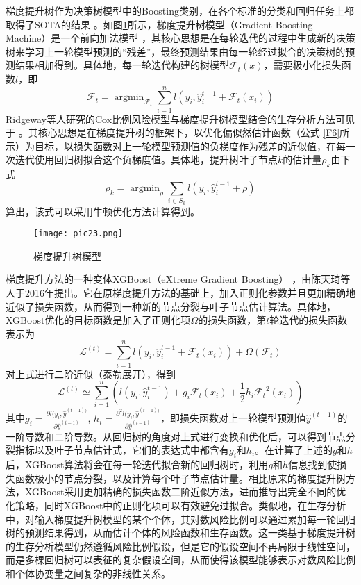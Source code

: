梯度提升树作为决策树模型中的Boosting类别，在各个标准的分类和回归任务上都取得了SOTA的结果 。如图\ref{pic23}所示，梯度提升树模型（Gradient Boosting Machine）是一个前向加法模型 ，其核心思想是在每轮迭代的过程中生成新的决策树来学习上一轮模型预测的“残差”，最终预测结果由每一轮经过拟合的决策树的预测结果相加得到。具体地，每一轮迭代构建的树模型$\mathcal{F}_t (x)$，需要极小化损失函数$l$，即
\begin{equation}
\mathcal{F}_t = \mathop{\arg\min}_{\mathcal{F}_t} \sum_{i=1}^n l(y_i, \hat{y}_i^{t-1} + \mathcal{F}_t(x_i)) \label{F9}
\end{equation}
Ridgeway等人研究的Cox比例风险模型与梯度提升树模型结合的生存分析方法可见于 。其核心思想是在梯度提升树的框架下，以优化偏似然估计函数（公式 \eqref{F6}所示）为目标，以损失函数对上一轮模型预测值的负梯度作为残差的近似值，在每一次迭代使用回归树拟合这个负梯度值。具体地，提升树叶子节点$k$的估计量$\rho_k$由下式
\begin{equation}
\rho_k = \mathop{\arg\min}_{\rho} \sum_{i\in S_k} l(y_i, \hat{y}_i^{t-1} + \rho) \label{F10}
\end{equation}算出，该式可以采用牛顿优化方法计算得到。

\begin{figure}[H]
\texttt{[image: pic23.png]}
\caption{梯度提升树模型}
\label{pic23}
\end{figure}

梯度提升方法的一种变体XGBoost（eXtreme Gradient Boosting） ，由陈天琦等人于2016年提出。它在原梯度提升方法的基础上，加入正则化参数并且更加精确地近似了损失函数，从而得到一种新的节点分裂与叶子节点估计算法。具体地，XGBoost优化的目标函数是加入了正则化项$\Omega$的损失函数，第$t$轮迭代的损失函数表示为 
\begin{equation}
\mathcal{L}^{(t)} = \sum_{i=1}^n l(y_i, \hat{y}_i^{t-1} + \mathcal{F}_t(x_i)) + \Omega(\mathcal{F}_t) \label{F11}
\end{equation}
对上式进行二阶近似（泰勒展开），得到
\begin{equation}
\mathcal{L}^{(t)} \simeq \sum_{i=1}^n \left( l(y_i, \hat{y}_i^{t-1})+g_i\mathcal{F}_t(x_i)+\frac{1}{2} h_i {\mathcal{F}_t}^2 (x_i) \right) \label{F12}
\end{equation}
其中$g_i=\frac{\partial l(y_i, \hat{y}^{(t-1))}}{\partial \hat{y}^{(t-1)}}$, $h_i=\frac{\partial^2 l(y_i, \hat{y}^{(t-1))}}{\partial \hat{y}^{(t-1)}}$，即损失函数对上一轮模型预测值$\hat{y}^{(t-1)}$的一阶导数和二阶导数。从回归树的角度对上式进行变换和优化后，可以得到节点分裂指标以及叶子节点估计式，它们的表达式中都含有$g_i$和$h_i$。在计算了上述的$g$和$h$后，XGBoost算法将会在每一轮迭代拟合新的回归树时，利用$g$和$h$信息找到使损失函数极小的节点分裂，以及计算每个叶子节点估计量。相比原来的梯度提升树方法，XGBoost采用更加精确的损失函数二阶近似方法，进而推导出完全不同的优化策略，同时XGBoost中的正则化项可以有效避免过拟合。类似地，在生存分析中，对输入梯度提升树模型的某个个体，其对数风险比例可以通过累加每一轮回归树的预测结果得到，从而估计个体的风险函数和生存函数。这一类基于梯度提升树的生存分析模型仍然遵循风险比例假设，但是它的假设空间不再局限于线性空间，而是多棵回归树可以表征的复杂假设空间，从而使得该模型能够表示对数风险比例和个体协变量之间复杂的非线性关系。

